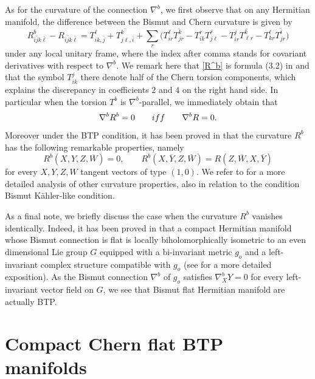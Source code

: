 \documentclass{amsart}
\numberwithin{equation}{section}
\theoremstyle{definition}
\renewcommand{\1}{\mathds{1}}
\renewcommand{\>}{\rightarrow}
\begin{document}
As for the curvature of the connection $\nabla^b$, we first observe that on any Hermitian manifold, the difference  between the Bismut and Chern curvature is given by
\begin{equation}\label{R^b} R^b_{i\bar{j}k\bar{\ell}}- R_{i\bar{j}k\bar{\ell}} = T^{\ell}_{ik,\bar{j}} +\overline{T^k_{j\ell , \bar{i}} } + \sum_r\big( T^{\ell}_{ir} \overline{T^k_{jr} } -  T^{r}_{ik} \overline{T^r_{j\ell } } - T^{j}_{ir} \overline{T^k_{\ell r} } - T^{\ell}_{kr} \overline{T^i_{jr} }  \big)  \end{equation}
under any local unitary frame, where the index after comma stands for covariant derivatives with respect to $\nabla^b$. We remark here that  \eqref{R^b} is formula (3.2) in \cite[Lemma 3.1]{ZhaoZ22} and that the symbol $T^j_{ik}$ there denote half of the Chern torsion components, which explains the discrepancy in coefficients $2$ and $4$ on the right hand side. In particular when the torsion $T^b$ is $\nabla^b$-parallel, we immediately obtain that
\begin{equation}\label{curv}  \nabla^b R^b = 0 \qquad {\rm{iff}}\qquad \nabla^b R =0.\end{equation}
Moreover under the {\rm BTP} condition, it has been proved in \cite{ZhaoZ22} that the curvature $R^b$ has the following remarkable properties, namely
$$R^b(X,Y,Z,\overline W) = 0,\qquad R^b(X,\overline Y,Z,\overline W) = R(Z,\overline W,X,\overline Y)$$
for every $X,Y,Z,W$ tangent vectors of type $(1,0)$. We refer to \cite{ZhaoZ22} for a more detailed analysis of other curvature properties, also in relation to the condition Bismut K\"ahler-like condition.

As a final note, we briefly discuss the case when the curvature $R^b$ vanishes identically. Indeed, it has been proved in \cite{WYZ} that a compact Hermitian manifold whose Bismut connection is flat is locally biholomorphically isometric to an even dimensional Lie group $G$ equipped with a bi-invariant metric $g_o$ and a left-invariant complex structure compatible with $g_o$ (see \cite{WYZ} for a more detailed exposition). As the Bismut connection $\nabla^b$ of $g_o$ satisfies $\nabla^b_XY=0$ for every left-invariant vector field on $G$, we see that Bismut flat Hermitian manifold are actually {\rm BTP}.

\section{Compact Chern flat {\rm BTP} manifolds}
\end{document}
